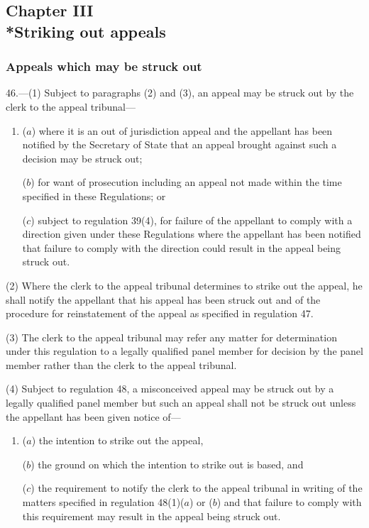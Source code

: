 \documentclass[12pt,a4paper]{article}
\begin{document}
\subsection[Chapter III --- Striking out appeals]{Chapter III\\*Striking out appeals}

\subsubsection[46. Appeals which may be struck out]{Appeals which may be struck out}

\renewcommand\parthead{--- Part V Chapter III}

46.—(1) Subject to paragraphs (2) and (3), an appeal may be struck out by the clerk to the appeal tribunal—
\begin{enumerate}\item[]
($a$) where it is an out of jurisdiction appeal and the appellant has been notified by the Secretary of State that an appeal brought against such a decision may be struck out;

($b$) for want of prosecution including an appeal not made within the time specified in these Regulations; or

($c$) subject to regulation 39(4), for failure of the appellant to comply with a direction given under these Regulations where the appellant has been notified that failure to comply with the direction could result in the appeal being struck out.
\end{enumerate}

(2) Where the clerk to the appeal tribunal determines to strike out the appeal, he shall notify the appellant that his appeal has been struck out and of the procedure for reinstatement of the appeal as specified in regulation 47.

(3) The clerk to the appeal tribunal may refer any matter for determination under this regulation to a legally qualified panel member for decision by the panel member rather than the clerk to the appeal tribunal.

(4) Subject to regulation 48, a misconceived appeal may be struck out by a legally qualified panel member but such an appeal shall not be struck out unless the appellant has been given notice of—
\begin{enumerate}\item[]
($a$) the intention to strike out the appeal,

($b$) the ground on which the intention to strike out is based, and

($c$) the requirement to notify the clerk to the appeal tribunal in writing of the matters specified in regulation 48(1)($a$) or ($b$) and that failure to comply with this requirement may result in the appeal being struck out.
\end{enumerate}
\end{document}
